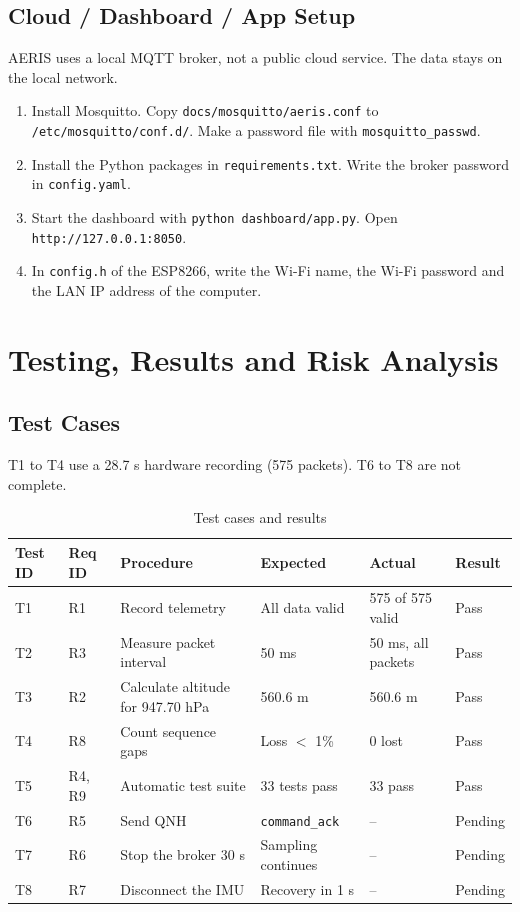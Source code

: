 \documentclass[12pt,a4paper]{report}
\begin{document}
\section{Cloud / Dashboard / App Setup}
AERIS uses a local MQTT broker, not a public cloud service. The data stays on the local network.
\begin{sloppypar}
\begin{enumerate}
\item Install Mosquitto. Copy \texttt{docs/mosquitto/aeris.conf} to \texttt{/etc/mosquitto/conf.d/}. Make a password file with \texttt{mosquitto\_passwd}.
\item Install the Python packages in \texttt{requirements.txt}. Write the broker password in \texttt{config.yaml}.
\item Start the dashboard with \texttt{python dashboard/app.py}. Open \texttt{http://127.0.0.1:8050}.
\item In \texttt{config.h} of the ESP8266, write the Wi-Fi name, the Wi-Fi password and the LAN IP address of the computer.
\end{enumerate}
\end{sloppypar}

\chapter{Testing, Results and Risk Analysis}
\section{Test Cases}
T1 to T4 use a 28.7 s hardware recording (575 packets). T6 to T8 are not complete.
\begin{table}[H]
\centering
\caption{Test cases and results}
\label{tab:tests}
\small
\begin{tabularx}{\textwidth}{llXXXl}
\toprule
\textbf{Test ID} & \textbf{Req ID} & \textbf{Procedure} & \textbf{Expected} & \textbf{Actual} & \textbf{Result}\\
\midrule
T1 & R1 & Record telemetry & All data valid & 575 of 575 valid & Pass\\
T2 & R3 & Measure packet interval & 50 ms & 50 ms, all packets & Pass\\
T3 & R2 & Calculate altitude for 947.70 hPa & 560.6 m & 560.6 m & Pass\\
T4 & R8 & Count sequence gaps & Loss $<$ 1\% & 0 lost & Pass\\
T5 & R4, R9 & Automatic test suite & 33 tests pass & 33 pass & Pass\\
T6 & R5 & Send QNH & \texttt{command\_ack} & -- & Pending\\
T7 & R6 & Stop the broker 30 s & Sampling continues & -- & Pending\\
T8 & R7 & Disconnect the IMU & Recovery in 1 s & -- & Pending\\
\bottomrule
\end{tabularx}
\end{table}
\end{document}
